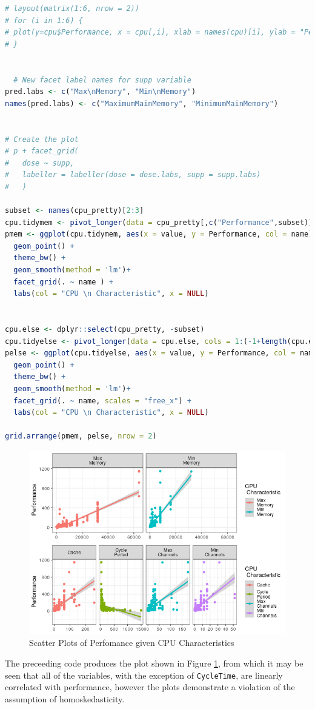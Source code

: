 \documentclass[
]{article}
\newcommand{\passthrough}[1]{#1}
\begin{document}
\begin{lstlisting}[language=R]
# layout(matrix(1:6, nrow = 2))
# for (i in 1:6) {
# plot(y=cpu$Performance, x = cpu[,i], xlab = names(cpu)[i], ylab = "Performance")
# }


  # New facet label names for supp variable
pred.labs <- c("Max\nMemory", "Min\nMemory")
names(pred.labs) <- c("MaximumMainMemory", "MinimumMainMemory")


# Create the plot
# p + facet_grid(
#   dose ~ supp, 
#   labeller = labeller(dose = dose.labs, supp = supp.labs)
#   )

subset <- names(cpu_pretty)[2:3]
cpu.tidymem <- pivot_longer(data = cpu_pretty[,c("Performance",subset)], cols = subset )
pmem <- ggplot(cpu.tidymem, aes(x = value, y = Performance, col = name)) +
  geom_point() + 
  theme_bw() +
  geom_smooth(method = 'lm')+
  facet_grid(. ~ name ) +
  labs(col = "CPU \n Characteristic", x = NULL)


cpu.else <- dplyr::select(cpu_pretty, -subset)
cpu.tidyelse <- pivot_longer(data = cpu.else, cols = 1:(-1+length(cpu.else)))
pelse <- ggplot(cpu.tidyelse, aes(x = value, y = Performance, col = name)) +
  geom_point() + 
  theme_bw() +
  geom_smooth(method = 'lm')+
  facet_grid(. ~ name, scales = "free_x") + 
  labs(col = "CPU \n Characteristic", x = NULL)

grid.arrange(pmem, pelse, nrow = 2)
\end{lstlisting}



\begin{figure}
\centering
\includegraphics[width=0.7\linewidth]{SecAssignment_files/figure-html/sp-1.png} 
\caption{Scatter Plots of Perfomance given CPU Characteristics}
\label{sp-1}
\end{figure}


The preceeding code produces the plot shown in Figure \ref{sp-1}, from which it may be seen that all of the variables, with the exception of
\passthrough{\lstinline!CycleTime!}, are linearly correlated with
performance, however the plots demonstrate a violation of the
assumption of homoskedasticity.
\end{document}
